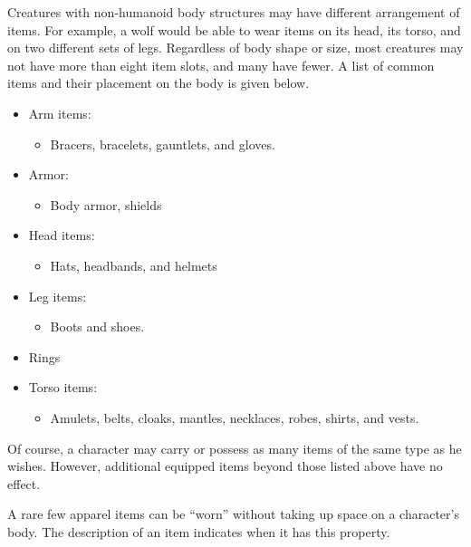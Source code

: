         Creatures with non-humanoid body structures may have different arrangement of items.
        For example, a wolf would be able to wear items on its head, its torso, and on two different sets of legs.
        Regardless of body shape or size, most creatures may not have more than eight item slots, and many have fewer.
        A list of common items and their placement on the body is given below.

        \begin{itemize}
            \item Arm items:
                \begin{itemize}
                    \item Bracers, bracelets, gauntlets, and gloves.
                \end{itemize}
            \item Armor:
                \begin{itemize}
                    \item Body armor, shields
                \end{itemize}
            \item Head items:
                \begin{itemize}
                    \item Hats, headbands, and helmets
                \end{itemize}
            \item Leg items:
                \begin{itemize}
                    \item Boots and shoes.
                \end{itemize}
            \item Rings
            \item Torso items:
                \begin{itemize}
                    \item Amulets, belts, cloaks, mantles, necklaces, robes, shirts, and vests.
                \end{itemize}
        \end{itemize}

        Of course, a character may carry or possess as many items of the same type as he wishes.
        However, additional equipped items beyond those listed above have no effect.

        A rare few apparel items can be ``worn'' without taking up space on a character's body.
        The description of an item indicates when it has this property.

